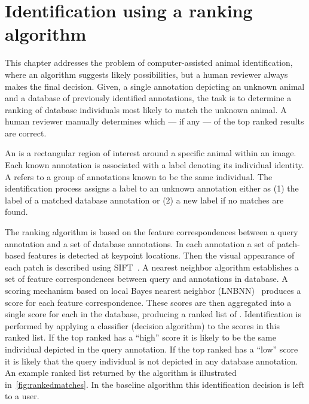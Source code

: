 \begin{comment}
    ./texfix.py --fpaths chapter3-matching.tex --outline --asmarkdown --numlines=999 -w
    ./texfix.py --fpaths chapter3-matching.tex --outline --asmarkdown --numlines=999 -w
    ./texfix.py --fpaths chapter3-matching.tex --reformat 
    # http://jaxedit.com/mark/
    fixtex --fpaths chapter3-matching.tex --outline --asmarkdown --numlines=999 --shortcite
\end{comment}

\chapter{Identification using a ranking algorithm}\label{chap:ranking}

    This chapter addresses the problem of computer-assisted animal identification, where an algorithm suggests
      likely possibilities, but a human reviewer always makes the final decision.
    Given, a single annotation depicting an unknown animal and a database of previously identified annotations,
      the task is to determine a ranking of database individuals most likely to match the unknown animal.
    A human reviewer manually determines which --- if any --- of the top ranked results are correct.

    An  is a rectangular region  of interest around a specific animal within an image. Each
    known annotation is associated with a \name{} label denoting its individual identity. A \glossterm{\name{}}
    refers to a group of annotations known to be the same individual. The identification process assigns a \name{}
    label to an unknown annotation either as (1) the \name{} label of a matched database annotation or (2) a new
    \name{} label if no matches are found.

    The ranking algorithm is based on the feature correspondences between a query annotation and a set of database
    annotations. In each annotation a set of patch-based features is detected at keypoint locations. Then the
    visual appearance of each patch is described using SIFT~\cite{lowe_distinctive_2004}. A nearest neighbor
    algorithm establishes a set of feature correspondences between query and annotations in database. A scoring
    mechanism based on local \naive{} Bayes nearest neighbor (LNBNN)~\cite{mccann_local_2012} produces a score for
    each feature correspondence. These scores are then aggregated into a single score for each \name{} in the
    database, producing a ranked list of \names{}. Identification is performed by applying a classifier (decision
    algorithm) to the scores in this ranked list. If the top ranked \name{} has a ``high'' score it is likely to be
    the same individual depicted in the query annotation. If the top ranked \name{} has a ``low'' score it is
    likely that the query individual is not depicted in any database annotation. An example ranked list returned by
    the algorithm is illustrated in~\cref{fig:rankedmatches}. In the baseline algorithm this identification
    decision is left to a user.

